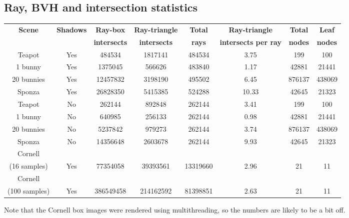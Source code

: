 \documentclass{article} %
\begin{document}
\subsection{Ray, BVH and intersection statistics}
\begin{tabular}{cccccccc}
{\bf Scene} & {\bf Shadows}       & {\bf Ray-box}    & {\bf Ray-triangle}  & {\bf Total} & {\bf Ray-triangle}       & {\bf Total} & {\bf Leaf}\\
            &                     & {\bf intersects} & {\bf intersects}    & {\bf rays}  & {\bf intersects per ray} & {\bf nodes} & {\bf nodes}\\
\hline
Teapot      & Yes                 & 484534           & 1817141             & 484534      & 3.75                     & 199         & 100\\
1 bunny     & Yes                 & 1375045          & 566626              & 483840      & 1.17                     & 42881       & 21441\\
20 bunnies  & Yes                 & 12457832         & 3198190             & 495502      & 6.45                     & 876137      & 438069\\
Sponza      & Yes                 & 26828350         & 5415385             & 524288      & 10.33                    & 42645       & 21323\\
Teapot      & No                  & 262144           & 892848              & 262144      & 3.41                     & 199         & 100\\
1 bunny     & No                  & 640985           & 256133              & 262144      & 0.98                     & 42881       & 21441\\
20 bunnies  & No                  & 5237842          & 979273              & 262144      & 3.74                     & 876137      & 438069\\
Sponza      & No                  & 14356648         & 2603678             & 262144      & 9.93                     & 42645       & 21323\\
Cornell\\
(16 samples)& Yes                 & 77354058         & 39393561            & 13319660    & 2.96                     & 21          & 11\\ 
Cornell\\
(100 samples)& Yes                & 386549458        & 214162592           & 81398851    & 2.63                     & 21          & 11\\ 
\end{tabular}

Note that the Cornell box images were rendered using multithreading, so the numbers are likely to be a bit off.
\end{document}
